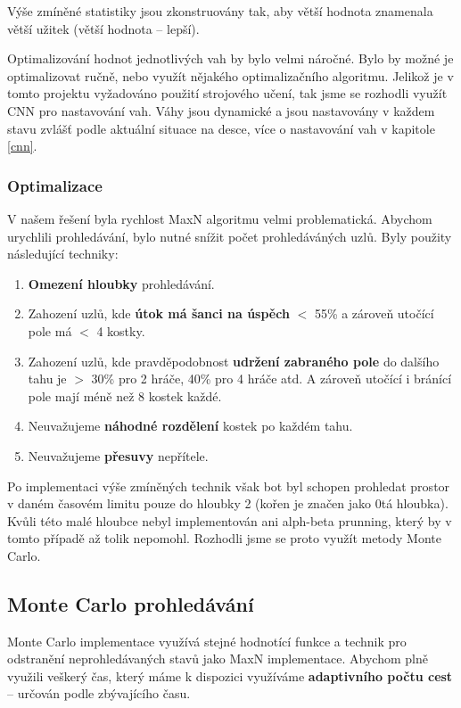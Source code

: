 \documentclass[12pt]{article}
\begin{document}
Výše zmíněné statistiky jsou zkonstruovány tak, aby větší hodnota znamenala větší užitek (větší hodnota -- lepší).

Optimalizování hodnot jednotlivých vah by bylo velmi náročné. Bylo by možné je optimalizovat ručně, nebo využít nějakého optimalizačního algoritmu. Jelikož je v tomto projektu vyžadováno použití strojového učení, tak jsme se rozhodli využít CNN pro nastavování vah. Váhy jsou dynamické a jsou nastavovány v každem stavu zvlášť podle aktuální situace na desce, více o nastavování vah v kapitole \ref{cnn}.

\subsubsection*{Optimalizace}
\label{optim}
V našem řešení byla rychlost MaxN algoritmu velmi problematická. Abychom urychlili prohledávání, bylo nutné snížit počet prohledáváných uzlů. Byly použity následující techniky:
\begin{enumerate}
    \item \textbf{Omezení hloubky} prohledávání.
    \item Zahození uzlů, kde \textbf{útok má šanci na úspěch} $<$ 55\% a zároveň utočící pole má $<$ 4 kostky.
    \item Zahození uzlů, kde pravděpodobnost \textbf{udržení zabraného pole} do dalšího tahu je $>$ 30\% pro 2 hráče, 40\% pro 4 hráče atd. A zároveň utočící i bránící pole mají méně než 8 kostek každé.
    \item Neuvažujeme \textbf{náhodné rozdělení} kostek po každém tahu.
    \item Neuvažujeme \textbf{přesuvy} nepřítele.
\end{enumerate}

Po implementaci výše zmíněných technik však bot byl schopen prohledat prostor v daném časovém limitu pouze do hloubky 2 (kořen je značen jako 0tá hloubka). Kvůli této malé hloubce nebyl implementován ani alph-beta prunning, který by v tomto případě až tolik nepomohl. Rozhodli jsme se proto využít metody Monte Carlo.

\subsection{Monte Carlo prohledávání}
\label{monte}
Monte Carlo implementace využívá stejné hodnotící funkce a technik pro odstranění neprohledávaných stavů jako MaxN implementace. Abychom plně využili veškerý čas, který máme k dispozici využíváme \textbf{adaptivního počtu cest} -- určován podle zbývajícího času. 
\end{document}
